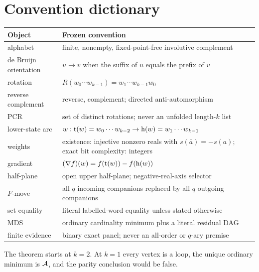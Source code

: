 \section{Convention dictionary}
\label{app:conventions}

\begin{center}
\begin{tabular}{>{\raggedright\arraybackslash}p{}p{}}
\toprule
Object & Frozen convention\\
\midrule
alphabet & finite, nonempty, fixed-point-free involutive complement\\
de Bruijn orientation & $u\to v$ when the suffix of $u$ equals the prefix of $v$\\
rotation & $R(w_0\cdots w_{k-1})=w_1\cdots w_{k-1}w_0$\\
reverse complement & reverse, complement; directed anti-automorphism\\
PCR & set of distinct rotations; never an unfolded length-$k$ list\\
lower-state arc & $w:\operatorname{t}(w)=w_0\cdots w_{k-2}\to\operatorname{h}(w)=w_1\cdots w_{k-1}$\\
weights & existence: injective nonzero reals with $s(\bar a)=-s(a)$;
exact bit complexity: integers\\
gradient & $(\nabla f)(w)=f(\operatorname{t}(w))-f(\operatorname{h}(w))$\\
half-plane & open upper half-plane; negative-real-axis selector\\
$F$-move & all $q$ incoming companions replaced by all $q$ outgoing companions\\
set equality & literal labelled-word equality unless stated otherwise\\
MDS & ordinary cardinality minimum plus a literal residual DAG\\
finite evidence & binary exact panel; never an all-order or $q$-ary premise\\
\bottomrule
\end{tabular}
\end{center}

The theorem starts at $k=2$.  At $k=1$ every vertex is a loop, the unique
ordinary minimum is $\mathcal A$, and the parity conclusion would be false.
